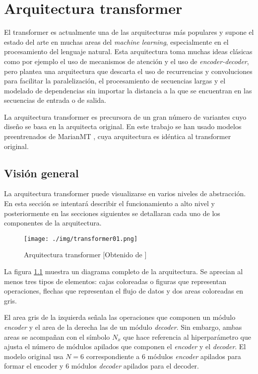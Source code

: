 \chapter{Arquitectura transformer}
El transformer \cite{Vaswani2017Jun} es actualmente una de las arquitecturas más populares y supone el estado del arte en muchas areas del \textit{machine learning}, especialmente en el procesamiento del lenguaje natural. Esta arquitectura toma muchas ideas clásicas como por ejemplo el uso de mecanismos de atención y el uso de \textit{encoder-decoder}, pero plantea una arquitectura que descarta el uso de recurrencias y convoluciones para facilitar la paralelización, el procesamiento de secuencias largas y el modelado de dependencias sin importar la distancia a la que se encuentran en las secuencias de entrada o de salida.

La arquitectura transformer es precursora de un gran número de variantes cuyo diseño se basa en la arquitecta original. En este trabajo se han usado modelos preentrenados de MarianMT \cite{Junczys-Dowmunt2018Apr}, cuya arquitectura es idéntica al transformer original.

\section{Visión general}\label{transformergeneral}

La arquitectura transformer puede visualizarse en varios niveles de abstracción. En esta sección se intentará describir el funcionamiento a alto nivel y posteriormente en las secciones siguientes se detallaran cada uno de los componentes de la arquitectura.

\begin{figure}[H]
    \centering
        \texttt{[image: ./img/transformer01.png]}
        \caption{Arquitectura transformer [Obtenido de \cite{Vaswani2017Jun}]}\label{transformerdiagram}
\end{figure}

La figura \ref{transformerdiagram} muestra un diagrama completo de la arquitectura. Se aprecian al menos tres tipos de elementos: cajas coloreadas o figuras que representan operaciones, flechas que representan el flujo de datos y dos areas coloreadas en gris.

El area gris de la izquierda señala las operaciones que componen un módulo \textit{encoder} y el area de la derecha las de un módulo \textit{decoder}. Sin embargo, ambas areas se acompañan con el símbolo $N_{x}$ que hace referencia al hiperparámetro que ajusta el número de módulos apilados que componen el \textit{encoder} y el \textit{decoder}. El modelo original usa $N=6$ correspondiente a 6 módulos \textit{encoder} apilados para formar el encoder y 6 módulos \textit{decoder} apilados para el decoder.

